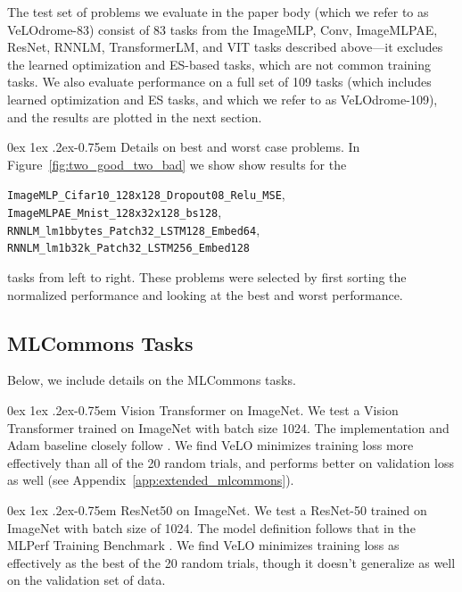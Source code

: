 \documentclass[11pt]{article}
\makeatletter
\renewcommand{\paragraph}{%
  \@startsection{paragraph}{4}%
  {\z@}{0ex \@plus 1ex \@minus .2ex}{-0.75em}%
  {\normalfont\normalsize\bfseries}%
}
\makeatother
\begin{document}
The test set of problems we evaluate in the paper body (which we refer to as VeLOdrome-83) consist of 83 tasks from the ImageMLP, Conv, ImageMLPAE, ResNet, RNNLM, TransformerLM, and VIT tasks described above---it excludes the learned optimization and ES-based tasks, which are not common training tasks. We also evaluate performance on a full set of 109 tasks (which includes learned optimization and ES tasks, and which we refer to as VeLOdrome-109), and the results are plotted in the next section. 

\paragraph{Details on best and worst case problems.}
In Figure~\ref{fig:two_good_two_bad} we show show results for the 
\begin{center} 
\texttt{ImageMLP\_Cifar10\_128x128\_Dropout08\_Relu\_MSE}, \texttt{ImageMLPAE\_Mnist\_128x32x128\_bs128},\\ \texttt{RNNLM\_lm1bbytes\_Patch32\_LSTM128\_Embed64}, \texttt{RNNLM\_lm1b32k\_Patch32\_LSTM256\_Embed128}
\end{center}
tasks from left to right.
These problems were selected by first sorting the normalized performance and looking at the best and worst performance.


\subsection{MLCommons Tasks}

Below, we include details on the MLCommons tasks. 

\paragraph{Vision Transformer on ImageNet.}
We test a Vision Transformer trained on ImageNet with batch size 1024. The implementation and Adam baseline closely follow \citet{beyer2022better}. We find VeLO minimizes training loss more effectively than all of the 20 random trials, and performs better on validation loss as well (see Appendix~\ref{app:extended_mlcommons}).

\paragraph{ResNet50 on ImageNet.}
We test a ResNet-50 trained on ImageNet with batch size of 1024.
The model definition follows that in the MLPerf Training Benchmark \citep{mattson2020mlperf}. 
We find VeLO minimizes training loss as effectively as the best of the 20 random trials, though it doesn't generalize as well on the validation set of data.
\end{document}
